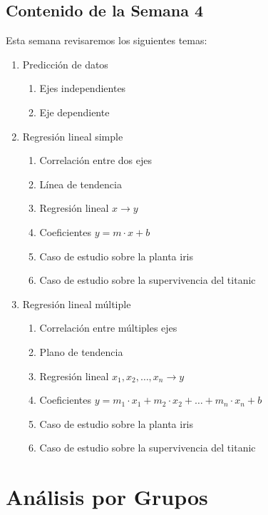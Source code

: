 \documentclass{article}
\begin{document}
\clearpage



\subsection{Contenido de la Semana 4}

Esta semana revisaremos los siguientes temas:

\begin{enumerate}
    \item Predicción de datos
    \begin{enumerate}
        \item Ejes independientes
        \item Eje dependiente
    \end{enumerate}
    \item Regresión lineal simple
    \begin{enumerate}
        \item Correlación entre dos ejes
        \item Línea de tendencia
        \item Regresión lineal $x \rightarrow y$
        \item Coeficientes $y = m \cdot x + b$
        \item Caso de estudio sobre la planta iris
        \item Caso de estudio sobre la supervivencia del titanic
    \end{enumerate}
    \item Regresión lineal múltiple
    \begin{enumerate}
        \item Correlación entre múltiples ejes
        \item Plano de tendencia
        \item Regresión lineal $x_1, x_2, \ldots, x_n \rightarrow y$
        \item Coeficientes $y = m_1 \cdot x_1 + m_2 \cdot x_2 + \ldots + m_n \cdot x_n + b$
        \item Caso de estudio sobre la planta iris
        \item Caso de estudio sobre la supervivencia del titanic
    \end{enumerate}
\end{enumerate}

\section{Análisis por Grupos}
\end{document}
